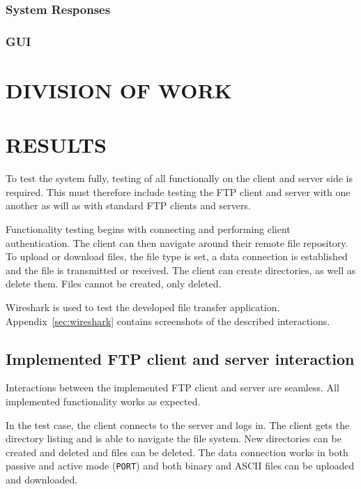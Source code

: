 \documentclass[10pt,twocolumn]{witseiepaper}
\begin{document}
\subsubsection*{System Responses}
\subsubsection*{GUI}




\section{DIVISION OF WORK}

\section{RESULTS}\label{results}

To test the system fully, testing of all functionally on the client and server side is required. This must therefore include testing the FTP client and server with one another as will as with standard FTP clients and servers.

Functionality testing begins with connecting and performing client authentication. The client can then navigate around their remote file repository. To upload or download files, the file type is set, a data connection is established and the file is transmitted or received. The client can create directories, as well as delete them. Files cannot be created, only deleted.

Wireshark is used to test the developed file transfer application. Appendix~\ref{sec:wireshark} contains screenshots of the described interactions. 

\subsection{Implemented FTP client and server interaction}

Interactions between the implemented FTP client and server are seamless. All implemented functionality works as expected.

In the test case, the client connects to the server and logs in. The client gets the directory listing and is able to navigate the file system. New directories can be created and deleted and files can be deleted. The data connection works in both passive and active mode (\texttt{PORT}) and both binary and ASCII files can be uploaded and downloaded.
 
\end{document}
